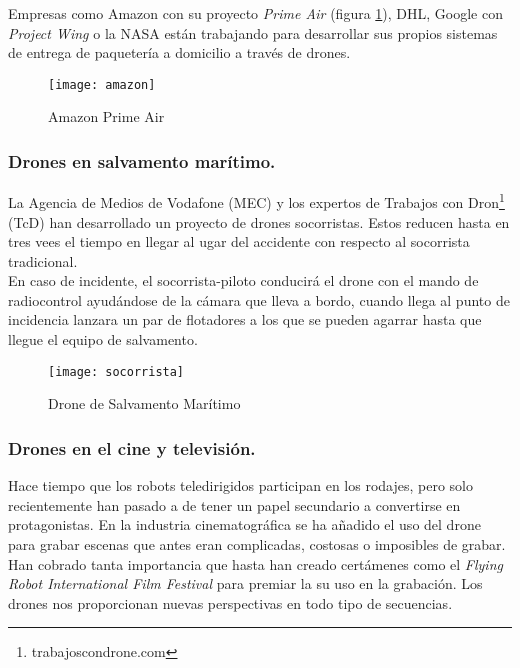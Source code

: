 Empresas como Amazon con su proyecto \emph{Prime Air} (figura \ref{fig:amazon}), DHL, Google con \emph{Project Wing} o la NASA están trabajando para desarrollar sus propios sistemas de entrega de paquetería a domicilio a través de drones.\\

\begin{figure}[htb]
\centering
\texttt{[image: amazon]}
\caption{Amazon Prime Air}
\label{fig:amazon}
\end{figure}

\subsubsection{Drones en salvamento marítimo.}

La Agencia de Medios de Vodafone (MEC) y los expertos de Trabajos con Dron\footnote{trabajoscondrone.com} (TcD) han desarrollado un proyecto de drones socorristas. Estos reducen hasta en tres vees el tiempo en llegar al ugar del accidente con respecto al socorrista tradicional.\\

En caso de incidente, el socorrista-piloto conducirá el drone con el mando de radiocontrol ayudándose de la cámara que lleva a bordo, cuando llega al punto de incidencia lanzara un par de flotadores a los que se pueden agarrar hasta que llegue el equipo de salvamento.\\

 \begin{figure}[htb]
\centering
\texttt{[image: socorrista]}
\caption{Drone de Salvamento Marítimo}
\label{fig:socorrista}
\end{figure}

\subsubsection{Drones en el cine y televisión.}

Hace tiempo que los robots teledirigidos participan en los rodajes, pero solo recientemente han pasado a de tener un papel secundario a convertirse en protagonistas. En la industria cinematográfica se ha añadido el uso del drone para grabar escenas que antes eran complicadas, costosas o imposibles de grabar. Han cobrado tanta importancia que hasta han creado certámenes como el \emph{Flying Robot International Film Festival} para premiar la su uso en la grabación. Los drones nos proporcionan nuevas perspectivas en todo tipo de secuencias.\\


